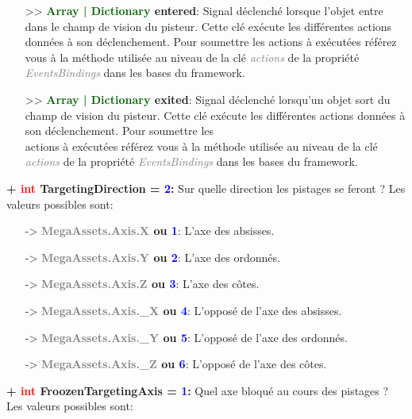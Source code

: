 \documentclass[a4paper, 11pt]{article}
\begin{document}
\begin{itemize}
		\item[>> \textbf{\textcolor{darkgreen}{Array | Dictionary} entered}:] Signal déclenché lorsque
		l'objet entre dans le champ de vision du pisteur. Cette clé exécute les différentes actions données
		à son déclenchement. Pour soumettre les actions à exécutées référez vous à la méthode utilisée au
		niveau de la clé \textit{\textcolor{gray}{actions}} de la propriété \textit{\textcolor{gray}
		{EventsBindings}} dans les bases du framework.\\
		\item[>> \textbf{\textcolor{darkgreen}{Array | Dictionary} exited}:] Signal déclenché lorsqu'un
		objet sort du champ de vision du pisteur. Cette clé exécute les différentes actions données à son
		déclenchement. Pour soumettre les \\actions à exécutées référez vous à la méthode utilisée au niveau
		de la clé \textit{\textcolor{gray}{actions}} de la propriété \textit{\textcolor{gray}
		{EventsBindings}} dans les bases du framework.\\
	\end{itemize}
	\textbf{+ \textcolor{red}{int} TargetingDirection = \textcolor{blue}{2}:} Sur quelle direction les 
	pistages se feront ? Les valeurs possibles sont:
	\begin{itemize}
		\item [-> \textbf{\textcolor{gray}{MegaAssets.Axis.X} ou \textcolor{blue}{1}}:] L'axe des absisses.
		\item [-> \textbf{\textcolor{gray}{MegaAssets.Axis.Y} ou \textcolor{blue}{2}}:] L'axe des ordonnés.
		\item [-> \textbf{\textcolor{gray}{MegaAssets.Axis.Z} ou \textcolor{blue}{3}}:] L'axe des côtes.
		\item [-> \textbf{\textcolor{gray}{MegaAssets.Axis.\_X} ou \textcolor{blue}{4}}:] L'opposé de l'axe 
		des absisses.
		\item [-> \textbf{\textcolor{gray}{MegaAssets.Axis.\_Y} ou \textcolor{blue}{5}}:] L'opposé de l'axe 
		des ordonnés.
		\item [-> \textbf{\textcolor{gray}{MegaAssets.Axis.\_Z} ou \textcolor{blue}{6}}:] L'opposé de l'axe 
		des côtes.\\
	\end{itemize}
	\textbf{+ \textcolor{red}{int} FroozenTargetingAxis = \textcolor{blue}{1}:} Quel axe bloqué au cours des 
	pistages ? Les valeurs possibles sont:
\end{document}
